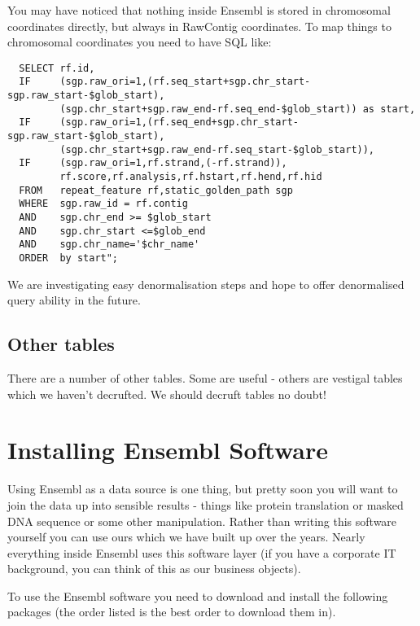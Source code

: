 \documentclass[11pt,a4paper]{article}
\begin{document}
You may have noticed that nothing inside Ensembl is stored in
chromosomal coordinates directly, but always in RawContig coordinates.
To map things to chromosomal coordinates you need to have SQL like:

\begin{verbatim}
  SELECT rf.id,
  IF     (sgp.raw_ori=1,(rf.seq_start+sgp.chr_start-sgp.raw_start-$glob_start),
         (sgp.chr_start+sgp.raw_end-rf.seq_end-$glob_start)) as start,                                        
  IF     (sgp.raw_ori=1,(rf.seq_end+sgp.chr_start-sgp.raw_start-$glob_start),
         (sgp.chr_start+sgp.raw_end-rf.seq_start-$glob_start)), 
  IF     (sgp.raw_ori=1,rf.strand,(-rf.strand)),                         
         rf.score,rf.analysis,rf.hstart,rf.hend,rf.hid  
  FROM   repeat_feature rf,static_golden_path sgp
  WHERE  sgp.raw_id = rf.contig
  AND    sgp.chr_end >= $glob_start 
  AND    sgp.chr_start <=$glob_end
  AND    sgp.chr_name='$chr_name' 
  ORDER  by start";
\end{verbatim}

We are investigating easy denormalisation steps and hope to offer denormalised
query ability in the future.

\subsection{Other tables}

There are a number of other tables. Some are useful - others are vestigal tables
which we haven't decrufted. We should decruft tables no doubt!


\section{Installing Ensembl Software}

Using Ensembl as a data source is one thing, but pretty soon you will
want to join the data up into sensible results - things like protein
translation or masked DNA sequence or some other manipulation. Rather
than writing this software yourself you can use ours which we have
built up over the years.  Nearly everything inside Ensembl uses this
software layer (if you have a corporate IT background, you can think
of this as our business objects).


To use the Ensembl software you need to download and install the
following packages (the order listed is the best order to download
them in).
\end{document}
